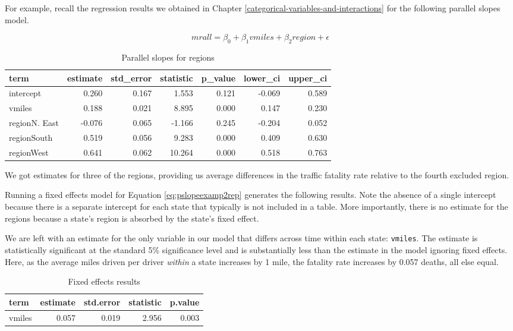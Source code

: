 \documentclass[
]{book}
\begin{document}
For example, recall the regression results we obtained in Chapter \ref{categorical-variables-and-interactions} for the following parallel slopes model.

\begin{equation}
mrall = \beta_0 + \beta_1vmiles + \beta_2region + \epsilon
\label{eq:pslopeexamp2rep}
\end{equation}

\begin{table}

\caption{\label{tab:psloperesults2rep}Parallel slopes for regions}
\centering
\begin{tabular}[t]{l|r|r|r|r|r|r}
\hline
term & estimate & std\_error & statistic & p\_value & lower\_ci & upper\_ci\\
\hline
intercept & 0.260 & 0.167 & 1.553 & 0.121 & -0.069 & 0.589\\
\hline
vmiles & 0.188 & 0.021 & 8.895 & 0.000 & 0.147 & 0.230\\
\hline
regionN. East & -0.076 & 0.065 & -1.166 & 0.245 & -0.204 & 0.052\\
\hline
regionSouth & 0.519 & 0.056 & 9.283 & 0.000 & 0.409 & 0.630\\
\hline
regionWest & 0.641 & 0.062 & 10.264 & 0.000 & 0.518 & 0.763\\
\hline
\end{tabular}
\end{table}

We got estimates for three of the regions, providing us average differences in the traffic fatality rate relative to the fourth excluded region.

Running a fixed effects model for Equation \eqref{eq:pslopeexamp2rep} generates the following results. Note the absence of a single intercept because there is a separate intercept for each state that typically is not included in a table. More importantly, there is no estimate for the regions because a state's region is absorbed by the state's fixed effect.

We are left with an estimate for the only variable in our model that differs across time within each state: \texttt{vmiles}. The estimate is statistically significant at the standard 5\% significance level and is substantially less than the estimate in the model ignoring fixed effects. Here, as the average miles driven per driver \emph{within} a state increases by 1 mile, the fatality rate increases by 0.057 deaths, all else equal.

\begin{table}

\caption{\label{tab:unnamed-chunk-64}Fixed effects results}
\centering
\begin{tabular}[t]{l|r|r|r|r}
\hline
term & estimate & std.error & statistic & p.value\\
\hline
vmiles & 0.057 & 0.019 & 2.956 & 0.003\\
\hline
\end{tabular}
\end{table}
\end{document}
